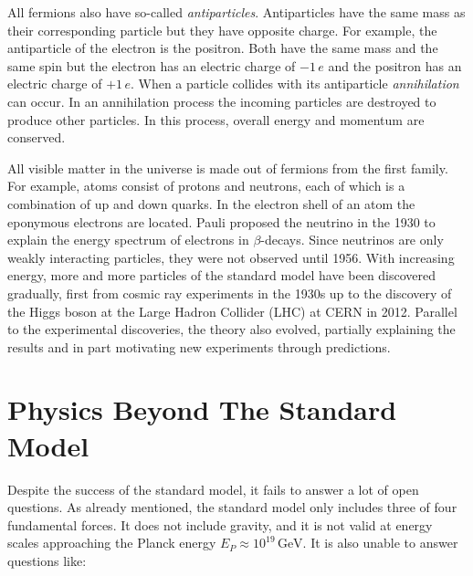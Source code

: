 \documentclass[a4paper,11pt,twosided,final,german,openbib,pdftex,listof=totoc,bibliography=totoc]{scrbook}
\begin{document}
All fermions also have so-called \textit{antiparticles}. Antiparticles have the same mass as their corresponding particle but they have opposite charge. For example, the antiparticle of the electron is the positron. Both have the same mass and the same spin but the electron has an electric charge of $-1\,e$ and the positron has an electric charge of $+1\,e$. When a particle collides with its antiparticle \textit{annihilation} can occur. In an annihilation process the incoming particles are destroyed to produce other particles. In this process, overall energy and momentum are conserved.
\newline


All visible matter in the universe is made out of fermions from the first family. For example, atoms consist of protons and neutrons, each of which is a combination of up and down quarks. In the electron shell of an atom the eponymous electrons are located. Pauli proposed the neutrino in the 1930 to explain the energy spectrum of electrons in $\beta$-decays. Since neutrinos are only weakly interacting particles, they were not observed until 1956.\cite{REINES19941} With increasing energy, more and more particles of the standard model have been discovered gradually, first from cosmic ray experiments in the 1930s up to the discovery of the Higgs boson at the Large Hadron Collider (LHC) at CERN in 2012. Parallel to the experimental discoveries, the theory also evolved, partially explaining the results and in part motivating new experiments through predictions.


\section{Physics Beyond The Standard Model}

Despite the success of the standard model, it fails to answer a lot of open questions. As already mentioned, the standard model only includes three of four fundamental forces. It does not include gravity, and it is not valid at energy scales approaching the Planck energy $E_P \approx 10^{19}\,\textrm{GeV} $.\cite{sivaram2007special} It is also unable to answer questions like:
\end{document}
